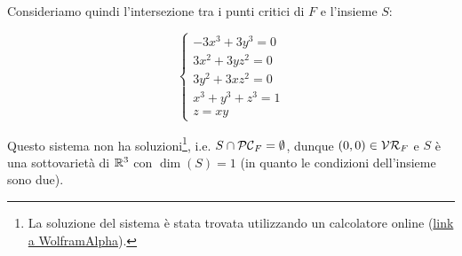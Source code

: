 {Consideriamo quindi l'intersezione tra i punti critici di $ F $ e l'insieme $ S $:

\begin{equation}
	\begin{cases}
		- 3 x^{3} + 3 y^{3} = 0 \\
		3 x^{2} + 3 y z^{2} = 0 \\
		3 y^{2} + 3 x z^{2} = 0 \\
		x^{3} + y^{3} + z^{3} = 1 \\
		z = xy
	\end{cases}
\end{equation}

Questo sistema non ha soluzioni\footnote{%
	La soluzione del sistema è stata trovata utilizzando un calcolatore online (\href{https://www.wolframalpha.com/input?i=solve+\%7B+-+3+x\%5E3+\%2B+3+y\%5E3+\%3D+0+\%2C+3+x\%5E2+\%2B+3+y+z\%5E2+\%3D+0+\%2C+3+y\%5E2+\%2B+3+x+z\%5E2+\%3D+0+\%2C+x\%5E3+\%2B+y\%5E3+\%2B+z\%5E3+\%3D+1+\%2C+z+\%3D+xy+\%7D}{link a WolframAlpha}).%
}, i.e. $ S \cap \mathcal{PC}_{F} = \emptyset $, dunque $ (0,0) \in \mathcal{VR}_{F} $ e $ S $ è una sottovarietà di $ \mathbb{R}^{3} $ con $ \dim(S) = 1 $ (in quanto le condizioni dell'insieme sono due).
}


